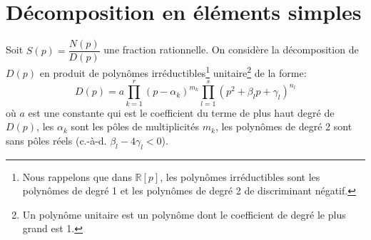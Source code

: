 \section{Décomposition en éléments simples}
Soit $S(p)=\dfrac{N(p)}{D(p)}$ une fraction rationnelle. On considère la 
décomposition de $D(p)$ en produit de polynômes irréductibles\footnote{Nous 
rappelons que dans $\mathbb{R}[p]$, les polynômes irréductibles sont 
les polynômes de degré 1 et les polynômes de degré 2 de discriminant négatif.}
unitaire\footnote{Un polynôme unitaire est un polynôme dont le coefficient 
de degré le plus grand est 1.} de la forme:
\[
D(p)=a\prod_{k=1}^r(p-\alpha_k)^{m_k}\prod_{l=1}^s(p^2+\beta_lp+\gamma_l)^{n_l}
\]
où $a$ est une constante qui est le coefficient du terme de plus haut degré 
de $D(p)$, les $\alpha_k$ sont les pôles de multiplicités $m_k$, les polynômes
de degré 2 sont sans pôles réels (c.-à-d. $\beta_l-4\gamma_l<0$).

